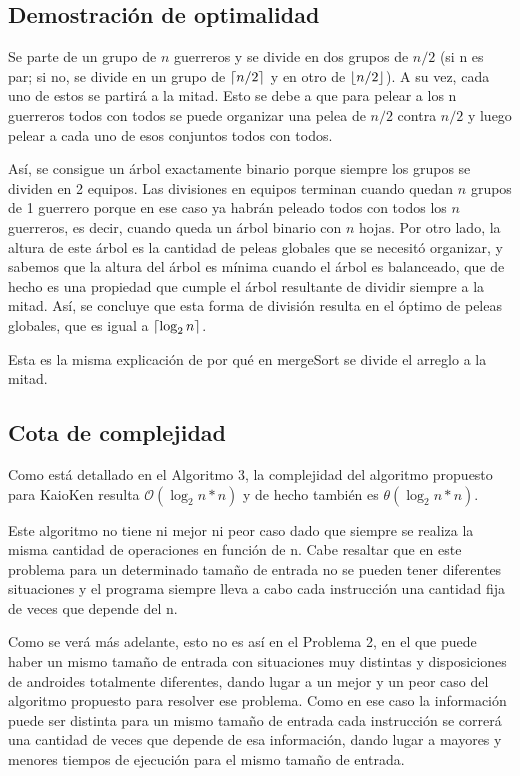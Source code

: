 \newpage
\subsection{Demostración de optimalidad}
Se parte de un grupo de $n$ guerreros y se divide en dos grupos de $n/2$ (si n es par; si no, se divide en un grupo de $\ceil*{n/2}$ y en otro de $\floor*{n/2}$). A su vez, cada uno de estos se partirá a la mitad.
Esto se debe a que para pelear a los n guerreros todos con todos se puede organizar una pelea de $n/2$ contra $n/2$ y luego pelear a cada uno de esos conjuntos todos con todos.
\par{Así, se consigue un árbol exactamente binario porque siempre los grupos se dividen en 2 equipos. Las divisiones en equipos terminan cuando quedan $n$ grupos de 1 guerrero porque en ese caso ya habrán peleado todos con todos los $n$ guerreros, es decir, cuando queda un árbol binario con $n$ hojas. Por otro lado, la altura de este árbol es la cantidad de peleas globales que se necesitó organizar, y sabemos que la altura del árbol es mínima cuando el árbol es balanceado, que de hecho es una propiedad que cumple el árbol resultante de dividir siempre a la mitad. Así, se concluye que esta forma de división resulta en el óptimo de peleas globales, que es igual a $\ceil*{\log_2 n}$.}
\par{Esta es la misma explicación de por qué en mergeSort se divide el arreglo a la mitad.}

\subsection{Cota de complejidad}
\par{Como está detallado en el Algoritmo 3, la complejidad del algoritmo propuesto para KaioKen resulta $\mathcal{O}(\log _{2} n * n)$ y de hecho también es $\mathcal{\theta}(\log _{2} n * n)$}.
\par{Este algoritmo no tiene ni mejor ni peor caso dado que siempre se realiza la misma cantidad de operaciones en función de n. Cabe resaltar que en este problema para un determinado tamaño de entrada no se pueden tener diferentes situaciones y el programa siempre lleva a cabo cada instrucción una cantidad fija de veces que depende del n.}
\par{Como se verá más adelante, esto no es así en el Problema 2, en el que puede haber un mismo tamaño de entrada con situaciones muy distintas y disposiciones de androides totalmente diferentes, dando lugar a un mejor y un peor caso del algoritmo propuesto para resolver ese problema. Como en ese caso la información puede ser distinta para un mismo tamaño de entrada cada instrucción se correrá una cantidad de veces que depende de esa información, dando lugar a mayores y menores tiempos de ejecución para el mismo tamaño de entrada.}


